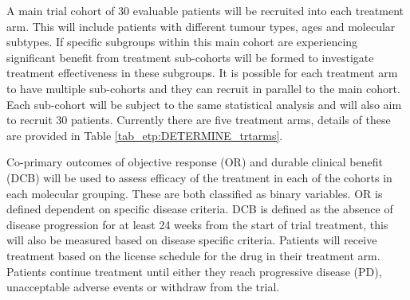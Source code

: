 A main trial cohort of 30 evaluable patients will be recruited into each treatment arm. This will include patients with different tumour types, ages and molecular subtypes. If specific subgroups within this main cohort are experiencing significant benefit from treatment sub-cohorts will be formed to investigate treatment effectiveness in these subgroups. It is possible for each treatment arm to have multiple sub-cohorts and they can recruit in parallel to the main cohort. Each sub-cohort will be subject to the same statistical analysis and will also aim to recruit 30 patients. Currently there are five treatment arms, details of these are provided in Table \ref{tab_etp:DETERMINE_trtarms}. 

\begin{table}[h!]
	\fontsize{10pt}{10pt}\selectfont
	\centering
	\caption{Current treatment arms in DETERMINE}
	\label{tab_etp:DETERMINE_trtarms}
\end{table}

Co-primary outcomes of objective response (OR) and durable clinical benefit (DCB) will be used to assess efficacy of the treatment in each of the cohorts in each molecular grouping. These are both classified as binary variables. OR is defined dependent on specific disease criteria. DCB is defined as the absence of disease progression for at least 24 weeks from the start of trial treatment, this will also be measured based on disease specific criteria. Patients will receive treatment based on the license schedule for the drug in their treatment arm. Patients continue treatment until either they reach progressive disease (PD), unacceptable adverse events or withdraw from the trial. 

